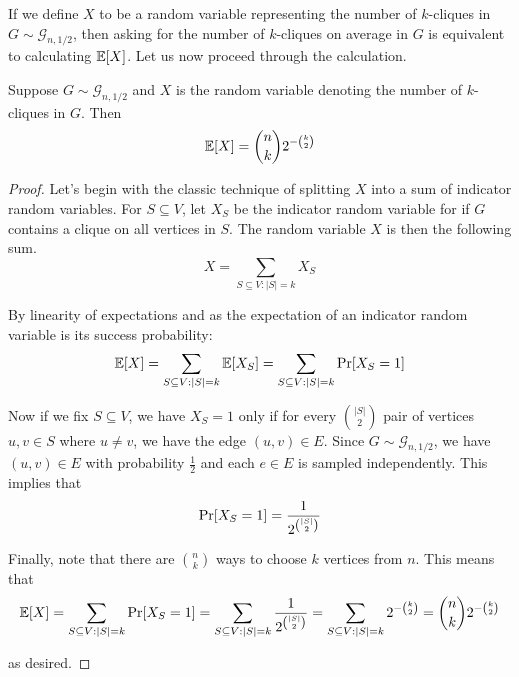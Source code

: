 \documentclass{article}
\begin{document}
If we define $X$ to be a random variable representing the number of $k$-cliques in $G \sim \mathcal{G}_{n, 1/2}$, then asking for the number of $k$-cliques on average in $G$ is equivalent to calculating $\mathbb{E}[X]$. Let us now proceed through the calculation.

\begin{claim}
Suppose $G \sim \mathcal{G}_{n, 1/2}$ and $X$ is the random variable denoting the number of $k$-cliques in $G$. Then 
\begin{equation*}
\mathbb{E} [X] = \binom{n}{k} 2^{-\binom{k}{2}}
\end{equation*}
\end{claim}
\begin{proof}
Let's begin with the classic technique of splitting $X$ into a sum of indicator random variables. For $S \subseteq V$, let $X_S$ be the indicator random variable for if $G$ contains a clique on all vertices in $S$. The random variable $X$ is then the following sum.
\begin{equation*}
X = \sum_{S \subseteq V : \lvert S \rvert = k} X_S
\end{equation*}

By linearity of expectations and as the expectation of an indicator random
variable is its success probability:
\begin{equation*}
\mathbb{E} [X]
= \sum_{S \subseteq V : \lvert S \rvert = k} \mathbb{E} [X_S]
= \sum_{S \subseteq V : \lvert S \rvert = k} \textup{Pr} [X_S = 1]
\end{equation*}

Now if we fix $S \subseteq V$, we have $X_S = 1$ only if for every $\binom{\lvert S \rvert}{2}$ pair of vertices $u, v \in S$ where $u \neq v$, we have the edge $(u, v) \in E$. Since $G \sim \mathcal{G}_{n, 1/2}$, we have $(u, v) \in E$ with probability $\frac{1}{2}$ and each $e \in E$ is sampled independently. This implies that
\begin{equation*}
\textup{Pr} [X_S = 1] = \frac{1}{2^{\binom{\lvert S \rvert}{2}}}
\end{equation*}

Finally, note that there are $\binom{n}{k}$ ways to choose $k$ vertices from $n$. This means that
\begin{equation*}
\mathbb{E} [X] = \sum_{S \subseteq V : \lvert S \rvert = k} \textup{Pr} [X_S = 1]
= \sum_{S \subseteq V : \lvert S \rvert = k} \frac{1}{2^{\binom{\lvert S \rvert}{2}}}
= \sum_{S \subseteq V : \lvert S \rvert = k} 2^{-\binom{k}{2}}
= \binom{n}{k} 2^{-\binom{k}{2}}
\end{equation*}

as desired.
\end{proof}
\end{document}
